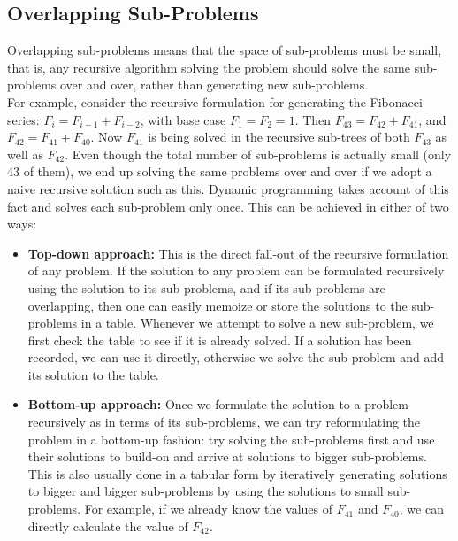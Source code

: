 \documentclass{report}
\begin{document}
    \subsection{Overlapping Sub-Problems}
    \bigskip
    Overlapping sub-problems means that the space of sub-problems must be small, that is, any recursive algorithm solving the problem should solve the same sub-problems over and over, rather than generating new sub-problems.\\
    For example, consider the recursive formulation for generating the Fibonacci series: $F_i = F_{i{-}1} + F_{i{-}2}$, with base case $F_1 = F_2 = 1$. Then $F_{43} = F_{42} + F_{41}$, and $F_{42} = F_{41} + F_{40}$. Now $F_{41}$ is being solved in the recursive sub-trees of both $F_{43}$ as well as $F_{42}$. Even though the total number of sub-problems is actually small (only 43 of them), we end up solving the same problems over and over if we adopt a naive recursive solution such as this. Dynamic programming takes account of this fact and solves each sub-problem only once.
    This can be achieved in either of two ways:
    \bigskip
    \begin{itemize}
        \item {\textbf{Top-down approach:}} This is the direct fall-out of the recursive formulation of any problem. If the solution to any problem can be formulated recursively using the solution to its sub-problems, and if its sub-problems are overlapping, then one can easily memoize or store the solutions to the sub-problems in a table. Whenever we attempt to solve a new sub-problem, we first check the table to see if it is already solved. If a solution has been recorded, we can use it directly, otherwise we solve the sub-problem and add its solution to the table. 
        \bigskip
        \item {\textbf{Bottom-up approach:}} Once we formulate the solution to a problem recursively as in terms of its sub-problems, we can try reformulating the problem in a bottom-up fashion: try solving the sub-problems first and use their solutions to build-on and arrive at solutions to bigger sub-problems. This is also usually done in a tabular form by iteratively generating solutions to bigger and bigger sub-problems by using the solutions to small sub-problems. For example, if we already know the values of $F_{41}$ and $F_{40}$, we can directly calculate the value of $F_{42}$.
    \end{itemize}
    
    
    
\end{document}
